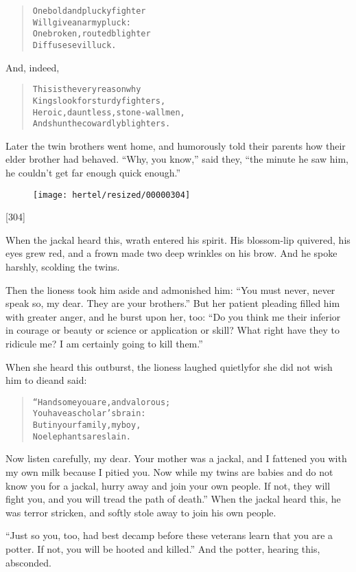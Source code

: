 \documentclass[article, twoside, 10pt]{memoir}
\renewenvironment{verbatim}{%
\begin{quote}%
\vskip -10pt%
\begin{alltt}\normalfont\small}{\end{alltt}%
\end{quote}%
\vskip -10pt
} %
\begin{document}
\begin{verbatim}
One bold and plucky fighter
    Will give an army pluck:
One broken, routed blighter
    Diffuses evil luck.
\end{verbatim}
And, indeed,

\begin{verbatim}
This is the very reason why
    Kings look for sturdy fighters,
Heroic, dauntless, stone-wall men,
    And shun the cowardly blighters.
\end{verbatim}
Later the twin brothers went home, and humorously told their
parents how their elder brother had behaved. ``Why, you know,''
said they,
``the minute he saw him, he couldn't get far enough quick enough.''
\begin{figure}[p]\texttt{[image: hertel/resized/00000304]}\end{figure}[304]

When the jackal heard this, wrath entered his spirit. His
blossom-lip quivered, his eyes grew red, and a frown made two deep
wrinkles on his brow. And he spoke harshly, scolding the twins.

Then the lioness took him aside and admonished him:
``You must never, never speak so, my dear. They are your brothers.''
But her patient pleading filled him with greater anger, and he
burst upon her, too:
``Do you think me their inferior in courage or beauty or science or application or skill? What right have they to ridicule me? I am certainly going to kill them.''

When she heard this outburst, the lioness laughed quietly{\textemdash}for she
did not wish him to die{\textemdash}and said:

\begin{verbatim}
“Handsome you are, and valorous;
    You have a scholar's brain:
But in your family, my boy,
    No elephants are slain.
\end{verbatim}
Now listen carefully, my dear. Your mother was a jackal, and I
fattened you with my own milk because I pitied you. Now while my
twins are babies and do not know you for a jackal, hurry away and
join your own people. If not, they will fight you, and you will
tread the path of death.” When the jackal heard this, he was terror
stricken, and softly stole away to join his own people.

``Just so you, too, had best decamp before these veterans learn that you are a potter. If not, you will be hooted and killed.''
And the potter, hearing this, absconded.
\end{document}
